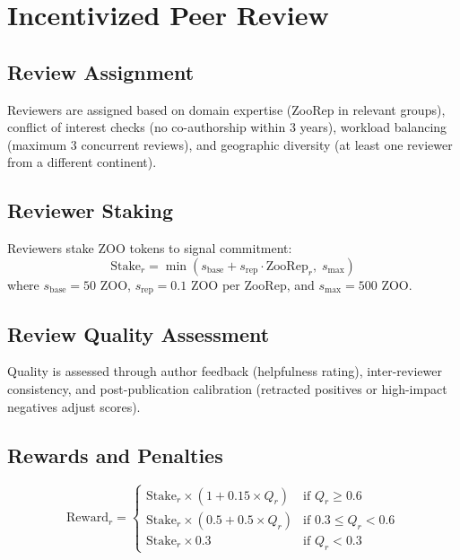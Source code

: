 \documentclass[11pt,a4paper]{article}
\newcommand{\ZOO}{\textsc{ZOO}}
\begin{document}
\section{Incentivized Peer Review}
\label{sec:review}

\subsection{Review Assignment}

Reviewers are assigned based on domain expertise (ZooRep in relevant
groups), conflict of interest checks (no co-authorship within 3 years),
workload balancing (maximum 3 concurrent reviews), and geographic
diversity (at least one reviewer from a different continent).

\subsection{Reviewer Staking}

Reviewers stake \ZOO{} tokens to signal commitment:
\begin{equation}
  \text{Stake}_r = \min(s_{\text{base}} + s_{\text{rep}} \cdot
  \text{ZooRep}_r,\; s_{\max})
\end{equation}
where $s_{\text{base}} = 50$ \ZOO{}, $s_{\text{rep}} = 0.1$ \ZOO{} per
ZooRep, and $s_{\max} = 500$ \ZOO{}.

\subsection{Review Quality Assessment}

Quality is assessed through author feedback (helpfulness rating),
inter-reviewer consistency, and post-publication calibration (retracted
positives or high-impact negatives adjust scores).

\subsection{Rewards and Penalties}

\begin{equation}
  \text{Reward}_r = \begin{cases}
    \text{Stake}_r \times (1 + 0.15 \times Q_r) & \text{if } Q_r \geq 0.6 \\
    \text{Stake}_r \times (0.5 + 0.5 \times Q_r) & \text{if } 0.3 \leq Q_r < 0.6 \\
    \text{Stake}_r \times 0.3 & \text{if } Q_r < 0.3
  \end{cases}
\end{equation}
\end{document}
